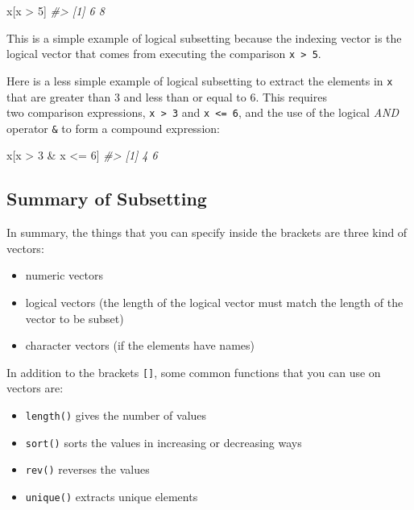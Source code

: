 \documentclass[
]{book}
\newenvironment{Shaded}{\begin{snugshade}}{\end{snugshade}}
\newcommand{\CommentTok}[1]{\textcolor[rgb]{0.56,0.35,0.01}{\textit{#1}}}
\newcommand{\DecValTok}[1]{\textcolor[rgb]{0.00,0.00,0.81}{#1}}
\newcommand{\NormalTok}[1]{#1}
\newcommand{\SpecialCharTok}[1]{\textcolor[rgb]{0.00,0.00,0.00}{#1}}
\providecommand{\tightlist}{%
  \setlength{\itemsep}{0pt}\setlength{\parskip}{0pt}}
\begin{document}
\begin{Shaded}
\begin{Highlighting}[]
\NormalTok{x[x }\SpecialCharTok{\textgreater{}} \DecValTok{5}\NormalTok{]}
\CommentTok{\#\textgreater{} [1] 6 8}
\end{Highlighting}
\end{Shaded}

This is a simple example of logical subsetting because the indexing vector
is the logical vector that comes from executing the comparison \texttt{x\ \textgreater{}\ 5}.

Here is a less simple example of logical subsetting to extract the elements in
\texttt{x} that are greater than 3 and less than or equal to 6. This requires\\
two comparison expressions, \texttt{x\ \textgreater{}\ 3} and \texttt{x\ \textless{}=\ 6}, and the use of the logical
\emph{AND} operator \texttt{\&} to form a compound expression:

\begin{Shaded}
\begin{Highlighting}[]
\NormalTok{x[x }\SpecialCharTok{\textgreater{}} \DecValTok{3} \SpecialCharTok{\&}\NormalTok{ x }\SpecialCharTok{\textless{}=} \DecValTok{6}\NormalTok{]}
\CommentTok{\#\textgreater{} [1] 4 6}
\end{Highlighting}
\end{Shaded}

\hypertarget{summary-of-subsetting}{%
\subsection{Summary of Subsetting}\label{summary-of-subsetting}}

In summary, the things that you can specify inside the brackets are three
kind of vectors:

\begin{itemize}
\item
  numeric vectors
\item
  logical vectors (the length of the logical vector must match the length
  of the vector to be subset)
\item
  character vectors (if the elements have names)
\end{itemize}

In addition to the brackets \texttt{{[}{]}}, some common functions that you can use on
vectors are:

\begin{itemize}
\tightlist
\item
  \texttt{length()} gives the number of values
\item
  \texttt{sort()} sorts the values in increasing or decreasing ways
\item
  \texttt{rev()} reverses the values
\item
  \texttt{unique()} extracts unique elements
\end{itemize}
\end{document}
